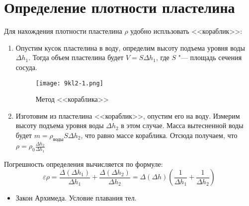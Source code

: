 \section{Определение плотности пластелина}
\SolveVariant
Для нахождения плотности пластелина \(\rho\) удобно испльзовать <<кораблик>>:
\begin{enumerate}
  \item Опустим кусок пластелина в воду, определим высоту подъема уровня воды \(\Delta h_1\). Тогда объем пластелина будет \(V=S\Delta h_1\), где \(S\) "--- площадь сечения сосуда.
  \begin{figure}[h]
    \centering
    \texttt{[image: 9kl2-1.png]}
    \caption{Метод <<кораблика>>}
  \end{figure}
  \item Изготовим из пластелина <<кораблик>>, опустим его на воду. Измерим высоту подъема уровня воды \(\Delta h_2\) в этом случае. Масса вытесненной воды будет \(m=\rho_\text{воды} S\Delta h_2 \), что равно массе кораблика. Отсюда получаем, что \( \rho = \rho_0 \frac{\Delta h_2}{\Delta h_1}\)
\end{enumerate}
\MesErrors
Погрешность определения вычисляется по формуле:
\begin{equation*}
\varepsilon \rho = \frac{\Delta(\Delta h_1)}{\Delta h_1} + \frac{\Delta(\Delta h_2)}{\Delta h_2}=\Delta(\Delta h) \left( \frac{1}{\Delta h_1} + \frac{1}{\Delta h_2} \right)
\end{equation*}
\SchoolBase
\begin{itemize}
  \item Закон Архимеда. Условие плавания тел.
\end{itemize}
\AdditionalQuestions
